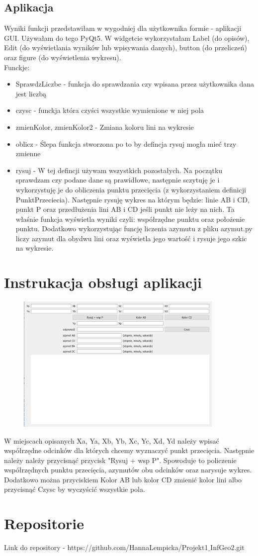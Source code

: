 \documentclass[10pt,a4paper]{article}
\begin{document}
\subsection{Aplikacja}
Wyniki funkcji przedstawiłam w wygodniej dla użytkownika formie - aplikacji GUI. Używałam do tego PyQt5. W widgetcie wykorzystałam Label (do opisów), Edit (do wyświetlania wyników lub wpisywania danych), button (do przeliczeń) oraz figure (do wyświetlenia wykresu). 
\\
Funckje:
\begin{itemize}
	\item SprawdzLiczbe - funkcja do sprawdzania czy wpisana przez użytkownika dana jest liczbą
	\item czysc - funckja która czyści wszystkie wymienione w niej pola 
	\item zmienKolor, zmienKolor2 - Zmiana koloru lini na wykresie
	\item oblicz - Ślepa funkcja stworzona po to by defincja rysuj mogła mieć trzy zmienne 
	\item rysuj - W tej defincji używam wszystkich pozostałych. Na początku sprawdzam czy podane dane są prawidłowe, następnie sczytuję je i wykorzystuję je do obliczenia punktu przecięcia (z wykorzystaniem definicji PunktPrzeciecia). Następnie rysuję wykres na którym będzie: linie AB i CD, punkt P oraz przedłużenia lini AB i CD jeśli punkt nie leży na nich. Ta właśnie funkcja wyświetla wyniki czyli: współrzędne punktu oraz położenie punktu. Dodatkowo wykorzystując funcję liczenia azymutu z pliku azymut.py liczy azymut dla obydwu lini oraz wyświetla jego wartość i rysuje jego szkic na wykresie. 
\end{itemize}

\section{Instrukacja obsługi aplikacji}
\begin{figure}[h]
	\centering
	\includegraphics[width=10cm]{apka.PNG}
\end{figure}
W miejscach opisanych Xa, Ya, Xb, Yb, Xc, Yc, Xd, Yd należy wpisać współrzędne odcinków dla których chcemy wyznaczyć punkt przecięcia. Następnie należy należy przycisnąć przycisk "Rysuj + wsp P". Spowoduje to policzenie współrzędnych punktu przecięcia, azymutów obu odcinków oraz narysuje wykres. Dodatkowo można przyciskiem Kolor AB lub kolor CD zmienić kolor lini albo przycisnąć Czysc by wyczyścić wszystkie pola. 

\section{Repositorie}
Link do repository - https://github.com/HannaLempicka/Projekt1$\_$InfGeo2.git
\end{document}
